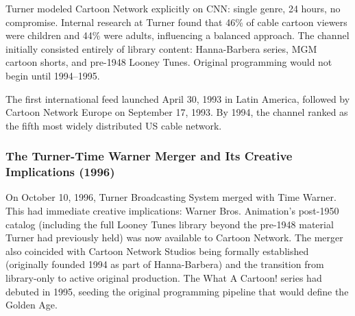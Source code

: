 \documentclass[11pt,letterpaper]{article}
\begin{document}
Turner modeled Cartoon Network explicitly on CNN: single genre, 24 hours, no compromise. Internal research at Turner found that 46\% of cable cartoon viewers were children and 44\% were adults, influencing a balanced approach. The channel initially consisted entirely of library content: Hanna-Barbera series, MGM cartoon shorts, and pre-1948 Looney Tunes. Original programming would not begin until 1994--1995.

The first international feed launched April 30, 1993 in Latin America, followed by Cartoon Network Europe on September 17, 1993. By 1994, the channel ranked as the fifth most widely distributed US cable network.

\subsubsection{The Turner-Time Warner Merger and Its Creative Implications (1996)}

On October 10, 1996, Turner Broadcasting System merged with Time Warner. This had immediate creative implications: Warner Bros. Animation's post-1950 catalog (including the full Looney Tunes library beyond the pre-1948 material Turner had previously held) was now available to Cartoon Network. The merger also coincided with Cartoon Network Studios being formally established (originally founded 1994 as part of Hanna-Barbera) and the transition from library-only to active original production. The What A Cartoon! series had debuted in 1995, seeding the original programming pipeline that would define the Golden Age.
\end{document}
